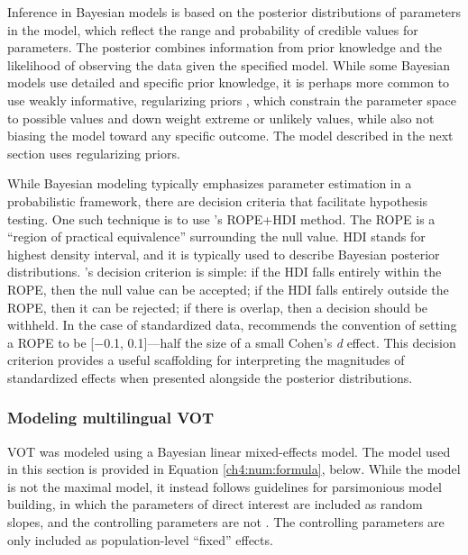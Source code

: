 Inference in Bayesian models is based on the posterior distributions of parameters in the model, which reflect the range and probability of credible values for parameters. The posterior combines information from prior knowledge and the likelihood of observing the data given the specified model. While some Bayesian models use detailed and specific prior knowledge, it is perhaps more common to use weakly informative, regularizing priors \citep{gelman_2017_prior}, which constrain the parameter space to possible values and down weight extreme or unlikely values, while also not biasing the model toward any specific outcome. The model described in the next section uses regularizing priors. 

While Bayesian modeling typically emphasizes parameter estimation in a probabilistic framework, there are decision criteria that facilitate hypothesis testing. One such technique is to use \citeauthor{kruschke_2011_rope}'s \citeyearpar{kruschke_2011_rope} ROPE+HDI method. The ROPE is a ``region of practical equivalence'' surrounding the null value. HDI stands for highest density interval, and it is typically used to describe Bayesian posterior distributions. \citeauthor{kruschke_2011_rope}'s \citeyearpar{kruschke_2011_rope} decision criterion is simple: if the HDI falls entirely within the ROPE, then the null value can be accepted; if the HDI falls entirely outside the ROPE, then it can be rejected; if there is overlap, then a decision should be withheld. In the case of standardized data, \citet{kruschke_2011_rope} recommends the convention of setting a ROPE to be [$-$0.1, 0.1]---half the size of a small Cohen's \textit{d} effect. This decision criterion provides a useful scaffolding for interpreting the magnitudes of standardized effects when presented alongside the posterior distributions. 

\subsubsection{Modeling multilingual VOT}

VOT was modeled using a Bayesian linear mixed-effects model. The model used in this section is provided in Equation \ref{ch4:num:formula}, below. While the model is not the maximal model, it instead follows guidelines for parsimonious model building, in which the parameters of direct interest are included as random slopes, and the controlling parameters are not \citep[see:][]{barr_2013_maximal, bates_2018_parsimonious}. The controlling parameters are only included as population-level ``fixed'' effects.

